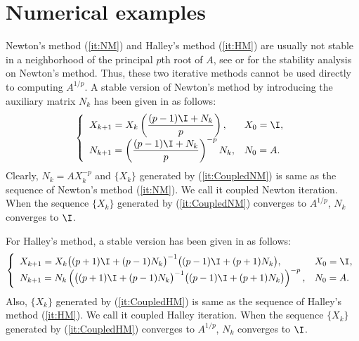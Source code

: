 \section{Numerical examples}

Newton's method (\ref{it:NM}) and Halley's method (\ref{it:HM}) are
usually not stable in a neighborhood of the principal $p$th root of
$A$, see \cite{Iannazzo2006} or \cite{Smith2003} for the stability
analysis on Newton's method. Thus, these two iterative methods
cannot be used directly to computing $A^{1/p}$. A stable version of
Newton's method by introducing the auxiliary matrix $N_k$ has been
given in \cite{Iannazzo2006} as follows:
\begin{equation}
\label{it:CoupledNM} \left\{
\begin{array}{ll}
\displaystyle X_{k + 1} = X_k \left(\frac{(p-1)\I + N_k}{p}\right),
& X_0 =
\I, \\
\displaystyle N_{k + 1} = \left(\frac{(p-1)\I + N_k}{p}\right)^{- p}
N_k, & N_0 = A.
\end{array} \right.
\end{equation}
Clearly, $N_k = AX_k^{-p}$ and $\{X_k\}$ generated by
(\ref{it:CoupledNM}) is same as the sequence of Newton's method
(\ref{it:NM}). We call it coupled Newton iteration. When the
sequence $\{X_k\}$ generated by (\ref{it:CoupledNM}) converges to
$A^{1/p}$, $N_k$ converges to $\I$.

For Halley's method, a stable version has been given in
\cite{Iannazzo2008} as follows:
\begin{equation}
\label{it:CoupledHM} \left\{
\begin{array}{ll}
\displaystyle X_{k + 1} = X_k \big((p+1)\I + (p-1)N_k\big)^{-1}
\big((p-1)\I + (p+1)N_k\big), & X_0 =
\I, \\
\displaystyle N_{k + 1} = N_k \left(\big((p+1)\I +
(p-1)N_k\big)^{-1} \big((p-1)\I + (p+1)N_k\big)\right)^{- p}, & N_0
= A.
\end{array} \right.
\end{equation}
Also, $\{X_k\}$ generated by (\ref{it:CoupledHM}) is same as the
sequence of Halley's method (\ref{it:HM}). We call it coupled Halley
iteration. When the sequence $\{X_k\}$ generated by
(\ref{it:CoupledHM}) converges to $A^{1/p}$, $N_k$ converges to
$\I$.


